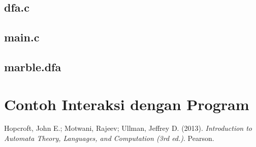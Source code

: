 \documentclass[a4paper,titlepage]{article}
\begin{document}
		\subsection{dfa.c}
			

		\subsection{main.c}
			

		\subsection{marble.dfa}
			

	\section{Contoh Interaksi dengan Program}

	\begin{thebibliography}{9}

		Hopcroft, John E.; Motwani, Rajeev; Ullman, Jeffrey D.
		(2013).
		\textit{Introduction to Automata Theory, Languages, and Computation (3rd ed.)}.
		Pearson.

	\end{thebibliography}
\end{document}
